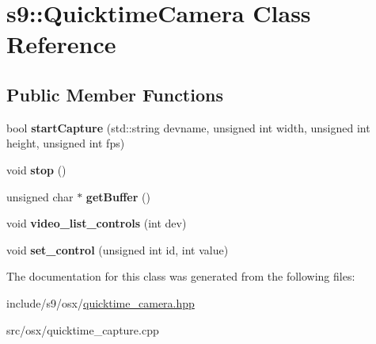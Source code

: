 \hypertarget{classs9_1_1QuicktimeCamera}{\section{s9\-:\-:\-Quicktime\-Camera \-Class \-Reference}
\label{classs9_1_1QuicktimeCamera}
}
\subsection*{\-Public \-Member \-Functions}
\begin{DoxyCompactItemize}
\item 
\hypertarget{classs9_1_1QuicktimeCamera_a5197756dd0a9546ffd3c6cc71db20ff0}{bool {\bfseries start\-Capture} (std\-::string devname, unsigned int width, unsigned int height, unsigned int fps)}\label{classs9_1_1QuicktimeCamera_a5197756dd0a9546ffd3c6cc71db20ff0}

\item 
\hypertarget{classs9_1_1QuicktimeCamera_ab51ba5fdf5594b0eb7bce5426a2d9961}{void {\bfseries stop} ()}\label{classs9_1_1QuicktimeCamera_ab51ba5fdf5594b0eb7bce5426a2d9961}

\item 
\hypertarget{classs9_1_1QuicktimeCamera_a44ecb32ada15b8f59d26da29e2db38d6}{unsigned char $\ast$ {\bfseries get\-Buffer} ()}\label{classs9_1_1QuicktimeCamera_a44ecb32ada15b8f59d26da29e2db38d6}

\item 
\hypertarget{classs9_1_1QuicktimeCamera_a7b1eaae3c1a9e12fd4cb77283caa9650}{void {\bfseries video\-\_\-list\-\_\-controls} (int dev)}\label{classs9_1_1QuicktimeCamera_a7b1eaae3c1a9e12fd4cb77283caa9650}

\item 
\hypertarget{classs9_1_1QuicktimeCamera_aed4ce05bafb61cbe74341131cb4de85b}{void {\bfseries set\-\_\-control} (unsigned int id, int value)}\label{classs9_1_1QuicktimeCamera_aed4ce05bafb61cbe74341131cb4de85b}

\end{DoxyCompactItemize}


\-The documentation for this class was generated from the following files\-:\begin{DoxyCompactItemize}
\item 
include/s9/osx/\hyperlink{quicktime__camera_8hpp}{quicktime\-\_\-camera.\-hpp}\item 
src/osx/quicktime\-\_\-capture.\-cpp\end{DoxyCompactItemize}
